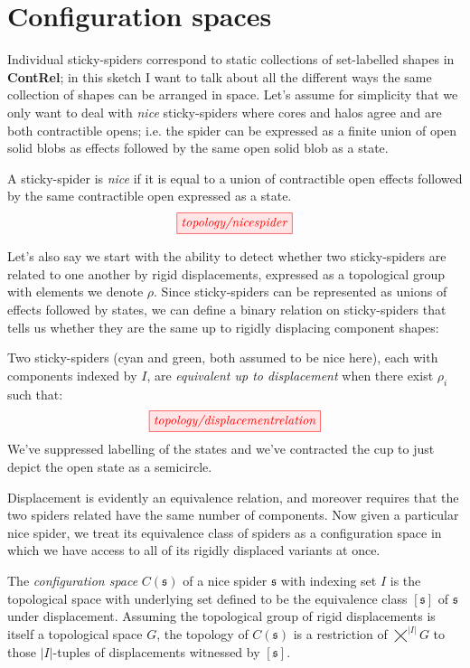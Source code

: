 \section{Configuration spaces}

Individual sticky-spiders correspond to static collections of set-labelled shapes in \textbf{ContRel}; in this sketch I want to talk about all the different ways the same collection of shapes can be arranged in space. Let's assume for simplicity that we only want to deal with \emph{nice} sticky-spiders where cores and halos agree and are both contractible opens; i.e. the spider can be expressed as a finite union of open solid blobs as effects followed by the same open solid blob as a state.

\begin{defn}
A sticky-spider is \emph{nice} if it is equal to a union of contractible open effects followed by the same contractible open expressed as a state.
\[\tikzfig{topology/nicespider}\]
\end{defn}

Let's also say we start with the ability to detect whether two sticky-spiders are related to one another by rigid displacements, expressed as a topological group with elements we denote $\rho$. Since sticky-spiders can be represented as unions of effects followed by states, we can define a binary relation on sticky-spiders that tells us whether they are the same up to rigidly displacing component shapes:

\begin{defn}
Two sticky-spiders (cyan and green, both assumed to be nice here), each with components indexed by $I$, are \emph{equivalent up to displacement} when there exist $\rho_i$ such that:
\[\tikzfig{topology/displacementrelation}\]
We've suppressed labelling of the states and we've contracted the cup to just depict the open state as a semicircle.
\end{defn}

Displacement is evidently an equivalence relation, and moreover requires that the two spiders related have the same number of components. Now given a particular nice spider, we treat its equivalence class of spiders as a configuration space in which we have access to all of its rigidly displaced variants at once.

\begin{defn}\label{defn:configurationspace}
The \emph{configuration space} $C(\mathfrak{s})$ of a nice spider $\mathfrak{s}$ with indexing set $I$ is the topological space with underlying set defined to be the equivalence class $[\mathfrak{s}]$ of $\mathfrak{s}$ under displacement. Assuming the topological group of rigid displacements is itself a topological space $G$, the topology of $C(\mathfrak{s})$ is a restriction of $\bigtimes^{|I|} G$ to those $|I|$-tuples of displacements witnessed by $[\mathfrak{s}]$.
\end{defn}

